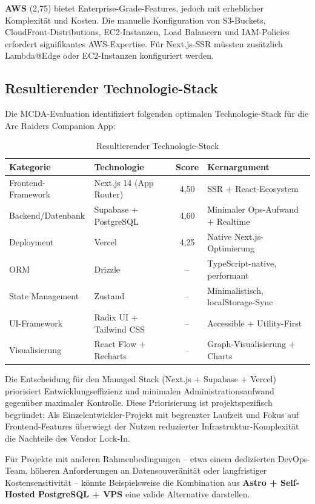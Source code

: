 \textbf{AWS} (2,75) bietet Enterprise-Grade-Features, jedoch mit erheblicher Komplexität und Kosten. Die manuelle Konfiguration von S3-Buckets, CloudFront-Distributions, EC2-Instanzen, Load Balancern und \ac{IAM}-Policies erfordert signifikantes AWS-Expertise. Für Next.js-SSR müssten zusätzlich Lambda@Edge oder EC2-Instanzen konfiguriert werden.

\subsection{Resultierender Technologie-Stack}
\label{sec:tech-stack-zusammenfassung}

Die MCDA-Evaluation identifiziert folgenden optimalen Technologie-Stack für die Arc Raiders Companion App:

\begin{table}[htbp]
\centering
\caption{Resultierender Technologie-Stack}
\label{tab:tech-stack}
\begin{tabular}{llcl}
\toprule
\textbf{Kategorie} & \textbf{Technologie} & \textbf{Score} & \textbf{Kernargument} \\
\midrule
Frontend-Framework & Next.js 14 (App Router) & 4,50 & SSR + React-Ecosystem \\
Backend/Datenbank & Supabase + PostgreSQL & 4,60 & Minimaler Ops-Aufwand + Realtime \\
Deployment & Vercel & 4,25 & Native Next.js-Optimierung \\
\midrule
ORM & Drizzle & -- & TypeScript-native, performant \\
State Management & Zustand & -- & Minimalistisch, localStorage-Sync \\
UI-Framework & Radix UI + Tailwind CSS & -- & Accessible + Utility-First \\
Visualisierung & React Flow + Recharts & -- & Graph-Visualisierung + Charts \\
\bottomrule
\end{tabular}
\end{table}

Die Entscheidung für den \glqq Managed Stack\grqq{} (Next.js + Supabase + Vercel) priorisiert Entwicklungseffizienz und minimalen Administrationsaufwand gegenüber maximaler Kontrolle. Diese Priorisierung ist projektspezifisch begründet: Als Einzelentwickler-Projekt mit begrenzter Laufzeit und Fokus auf Frontend-Features überwiegt der Nutzen reduzierter Infrastruktur-Komplexität die Nachteile des Vendor Lock-In.

Für Projekte mit anderen Rahmenbedingungen – etwa einem dedizierten DevOps-Team, höheren Anforderungen an Datensouveränität oder langfristiger Kostensensitivität – könnte Beispielsweise die Kombination aus \textbf{Astro + Self-Hosted PostgreSQL + VPS} eine valide Alternative darstellen.

